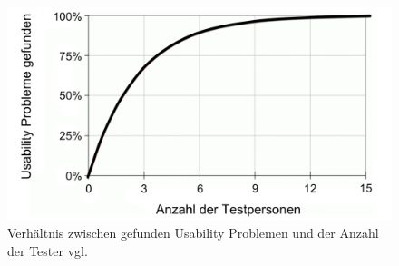 \begin{description}
%
%
%
%
%



\begin{figure}[H]
    \centering
    \includegraphics[width=.8\textwidth]{files/usa/anzahlTester}
    \caption{Verhältnis zwischen gefunden Usability Problemen und der Anzahl der Tester vgl. \cite{Nielsen:uc}}
    \label{pic:UsaTesters}
\end{figure}
 
 

\end{description}
